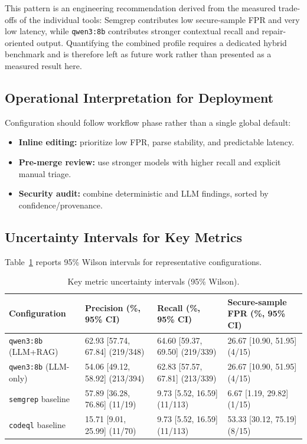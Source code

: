 This pattern is an engineering recommendation derived from the measured trade-offs of the individual tools: Semgrep contributes low secure-sample FPR and very low latency, while \texttt{qwen3:8b} contributes stronger contextual recall and repair-oriented output. Quantifying the combined profile requires a dedicated hybrid benchmark and is therefore left as future work rather than presented as a measured result here.

\subsection*{Operational Interpretation for Deployment}

Configuration should follow workflow phase rather than a single global default:
\begin{itemize}
  \item \textbf{Inline editing:} prioritize low FPR, parse stability, and predictable latency.
  \item \textbf{Pre-merge review:} use stronger models with higher recall and explicit manual triage.
  \item \textbf{Security audit:} combine deterministic and LLM findings, sorted by confidence/provenance.
\end{itemize}

\subsection*{Uncertainty Intervals for Key Metrics}

Table~\ref{tab:eval-ci-key} reports 95\% Wilson intervals for representative configurations.

\begin{table}[H]
  \centering
  \caption{Key metric uncertainty intervals (95\% Wilson).}
  \label{tab:eval-ci-key}
  \footnotesize
  \renewcommand{\arraystretch}{1.15}
  \begin{tabularx}{\textwidth}{p{}XXX}
    \toprule
    Configuration & Precision (\%, 95\% CI) & Recall (\%, 95\% CI) & Secure-sample FPR (\%, 95\% CI) \\
    \midrule
    \texttt{qwen3:8b} (LLM+RAG) & 62.93 [57.74, 67.84] (219/348) & 64.60 [59.37, 69.50] (219/339) & 26.67 [10.90, 51.95] (4/15) \\
    \texttt{qwen3:8b} (LLM-only) & 54.06 [49.12, 58.92] (213/394) & 62.83 [57.57, 67.81] (213/339) & 26.67 [10.90, 51.95] (4/15) \\
    \texttt{semgrep} baseline & 57.89 [36.28, 76.86] (11/19) & 9.73 [5.52, 16.59] (11/113) & 6.67 [1.19, 29.82] (1/15) \\
    \texttt{codeql} baseline & 15.71 [9.01, 25.99] (11/70) & 9.73 [5.52, 16.59] (11/113) & 53.33 [30.12, 75.19] (8/15) \\
    \bottomrule
  \end{tabularx}
\end{table}

